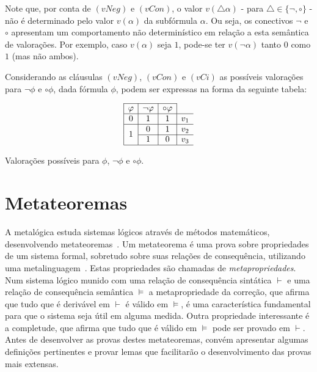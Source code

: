         Note que, por conta de $(vNeg)$ e $(vCon)$, o valor $v(\triangle \alpha)$ {-} para $\triangle \in \{\neg, \circ\}$ {-} não é determinado pelo valor $v(\alpha)$ da subfórmula $\alpha$. Ou seja, os conectivos $\neg$ e $\circ$ apresentam um comportamento não determinístico em relação a esta semântica de valorações. Por exemplo, caso $v(\alpha)$ seja $1$, pode-se ter $v(\neg \alpha)$ tanto $0$ como $1$ (mas não ambos).

        Considerando as cláusulas $(vNeg)$, $(vCon)$ e $(vCi)$ as possíveis valorações para $\neg \phi$ e $\circ \phi$, dada fórmula $\phi$, podem ser expressas na forma da seguinte tabela:

        \begin{table}[h]
            \[
                \begin{array}{|c|c|c|c}
                    \cline{1-3}
                    \phi & \neg\phi & \circ\phi & \\ \hline
                    0 & 1 & 1 & v_1 \\ \hline
                    \multirow{2}{*}{1} & 0 & 1 & v_2 \\ \cline{2-4}
                    & 1 & 0 & v_3 \\ \hline
                \end{array}
                \]
                \caption{Valorações possíveis para $\phi$, $\neg \phi$ e $\circ \phi$.}
                \label{tab:negcirc}
        \end{table}

        
                
\section{Metateoremas}\label{sec:metateoremas}
  A metalógica estuda sistemas lógicos através de métodos matemáticos, desenvolvendo metateoremas~\cite{Jacquette2002-JACACT-7}. Um metateorema é uma prova sobre propriedades de um sistema formal, sobretudo sobre suas relações de consequência, utilizando uma metalinguagem~\cite{Tarski1956-TARLSM,Barile_2024}. Estas propriedades são chamadas de \textit{metapropriedades}. Num sistema lógico munido com uma relação de consequência sintática $\vdash$ e uma relação de consequência semântica $\vDash$ a metapropriedade da correção, que afirma que tudo que é derivável em $\vdash$ é válido em $\vDash$, é uma característica fundamental para que o sistema seja útil em alguma medida. Outra propriedade interessante é a completude, que afirma que tudo que é válido em $\vDash$ pode ser provado em $\vdash$. Antes de desenvolver as provas destes metateoremas, convém apresentar algumas definições pertinentes e provar lemas que facilitarão o desenvolvimento das provas mais extensas.

